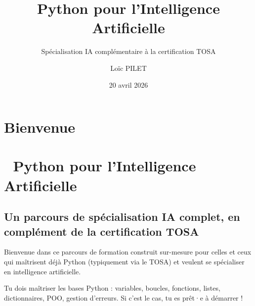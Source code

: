 \documentclass[
  french,
  11pt,
  a4paper,
]{scrbook}
\title{Python pour l'Intelligence Artificielle}
\subtitle{Spécialisation IA complémentaire à la certification TOSA}
\author{Loïc PILET}
\date{20 avril 2026}
\renewcommand*\contentsname{Table des matières}
\newcommand\contentsname{Table des matières}
\begin{document}
\frontmatter
\maketitle

\renewcommand*\contentsname{Table des matières}
{
\setcounter{tocdepth}{2}
\tableofcontents
}

\mainmatter
{}

\chapter{Bienvenue}\label{bienvenue}


\chapter*{🐍 Python pour l'Intelligence
Artificielle}\label{python-pour-lintelligence-artificielle}


\section{Un parcours de spécialisation IA complet, en complément de la
certification
TOSA}\label{un-parcours-de-spuxe9cialisation-ia-complet-en-compluxe9ment-de-la-certification-tosa}

Bienvenue dans ce parcours de formation construit sur-mesure pour celles
et ceux qui maîtrisent déjà Python (typiquement via le TOSA) et veulent
se spécialiser en intelligence artificielle.

\begin{tcolorbox}[enhanced jigsaw, arc=.35mm, bottomrule=.15mm, bottomtitle=1mm, breakable, colback=white, colbacktitle=quarto-callout-tip-color!10!white, colframe=quarto-callout-tip-color-frame, coltitle=black, left=2mm, leftrule=.75mm, opacityback=0, opacitybacktitle=0.6, rightrule=.15mm, title=\textcolor{quarto-callout-tip-color}{\faLightbulb}\hspace{0.5em}{Prérequis}, titlerule=0mm, toprule=.15mm, toptitle=1mm]

Tu dois maîtriser les bases Python : variables, boucles, fonctions,
listes, dictionnaires, POO, gestion d'erreurs. Si c'est le cas, tu es
prêt·e à démarrer !

\end{tcolorbox}
\end{document}

